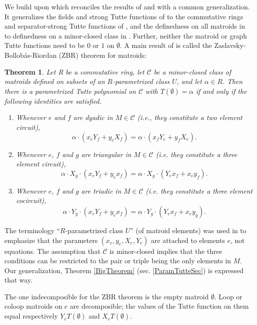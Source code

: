 \documentclass[12pt,leqno]{amsart}
\newtheorem{thm}[lem]{Theorem}
\theoremstyle{remark}
\begin{document}
We build upon \cite{Ellis-Monaghan-Traldi} which reconciles
the results of \cite{MR93a:05047} and 
\cite{BollobasRiordanTuttePolyColored} with a common generalization.  
It generalizes the fields and strong Tutte functions of \cite{MR93a:05047}
to the commutative rings and separator-strong Tutte functions of 
\cite{BollobasRiordanTuttePolyColored}, and the definedness on 
all matroids in \cite{BollobasRiordanTuttePolyColored} to definedness
on a minor-closed class in \cite{MR93a:05047}.  Further, neither the
matroid or graph Tutte functions need to be 
$0$ or $1$ on $\emptyset$.
A main result of \cite{Ellis-Monaghan-Traldi} is called the
Zaslavsky-Bollob\'{a}s-Riordan (ZBR) theorem for matroids:
\begin{thm}
\label{ZBRmatroids}
Let R
be a commutative ring, let $\mathcal{C}$ be a minor-closed class of matroids 
defined on subsets of an $R$-parametrized class $U$, and let 
$\alpha\in R$. 
Then there is a parametrized Tutte polynomial on
$\mathcal{C}$
with $T(\emptyset)=\alpha$ if and only if the following identities are 
satisfied.
\begin{enumerate}
\item[a]
Whenever $e$ and $f$ are dyadic in $M\in\mathcal{C}$ 
(i.e., they constitute a two element circuit),
\[
\alpha\cdot(x_e Y_f + y_e X_f) = \alpha\cdot (x_f Y_e + y_f X_e ).
\]
\item[b]
Whenever $e$, $f$ and $g$ are triangular in $M\in\mathcal{C}$ 
(i.e. they constitute a three element circuit),
\[
\alpha\cdot  X_g\cdot (x_e Y_f + y_e x_f) = 
\alpha\cdot  X_g\cdot (Y_e x_f + x_e y_f ).
\]
\item[c]
Whenever $e$, $f$ and $g$ are triadic in $M\in\mathcal{C}$ 
(i.e. they constitute a three element cocircuit),
\[
\alpha\cdot Y_g\cdot  (x_e Y_f + y_e x_f) = 
\alpha\cdot Y_g \cdot (Y_e x_f + x_e y_g ).
\]
\end{enumerate}
\end{thm}

The terminology ``$R$-parametrized class $U$'' (of matroid elements)
was used in \cite{Ellis-Monaghan-Traldi} to emphasize that the parameters
$(x_e,y_e,X_e,Y_e)$ are attached to elements $e$, not equations.  
The assumption that $\mathcal{C}$ is minor-closed implies that the 
three conditions can be restricted to the pair or triple being the
only elements in $M$.  Our generalization, Theorem \ref{BigTheorem} 
(sec. \ref{ParamTutteSec})
is expressed that way.

The 
one indecomposible for the ZBR theorem is the empty matroid
$\emptyset$.   Loop or coloop matroids on $e$ are 
decomposible; the values of the Tutte function on them equal
respectively $Y_e T(\emptyset)$ and $X_e T(\emptyset)$.   
\end{document}
